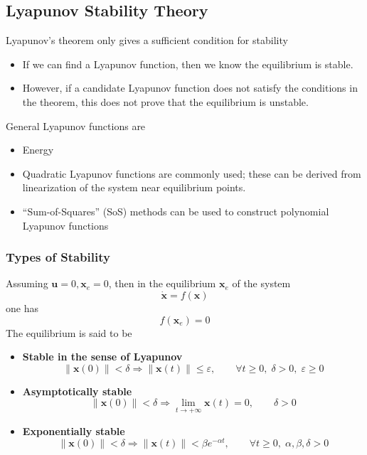 \subsection{Lyapunov Stability Theory}
Lyapunov's theorem only gives a sufficient condition for stability
\begin{itemize}
    \item If we can find a Lyapunov function, then we know the equilibrium is stable.
    \item However, if a candidate Lyapunov function does not satisfy the conditions in the theorem, this does not prove that the equilibrium is unstable.
\end{itemize}
General Lyapunov functions are
\begin{itemize}
    \item Energy
    \item Quadratic Lyapunov functions are commonly used; these can be derived from linearization of the system near equilibrium points.
    \item “Sum-of-Squares” (SoS) methods can be used to construct polynomial Lyapunov functions
\end{itemize}

\subsubsection{Types of Stability}
Assuming $\mathbf{u}=0, \mathbf{x}_e=0$, then in the equilibrium $\mathbf{x}_e$ of the system
\begin{equation*}
    \dot{\mathbf{x}} = f(\mathbf{x})
\end{equation*}
one has
\noindent\begin{equation*}
    f(\mathbf{x}_e) = 0
\end{equation*}
The equilibrium is said to be
\begin{itemize}
    \item \textbf{Stable in the sense of Lyapunov}
          \noindent\begin{equation*}
              \|\mathbf{x}(0)\| < \delta \Rightarrow \|\mathbf{x}(t)\| \leq \varepsilon,\qquad \forall t\geq 0,\; \delta > 0,\; \varepsilon\geq0
          \end{equation*}
    \item \textbf{Asymptotically stable}
          \noindent\begin{equation*}
              \|\mathbf{x}(0)\| < \delta \Rightarrow \lim_{t\to +\infty} \mathbf{x}(t)=0, \qquad \delta>0
          \end{equation*}
    \item \textbf{Exponentially stable}
          \noindent\begin{equation*}
              \|\mathbf{x}(0)\| < \delta \Rightarrow \|\mathbf{x}(t)\| < \beta e^{-\alpha t}, \qquad \forall t\geq 0,\; \alpha, \beta, \delta >0
          \end{equation*}
\end{itemize}

